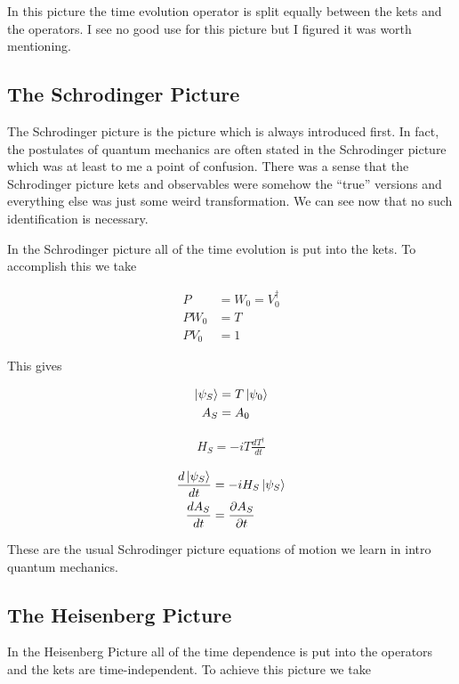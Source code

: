 \documentclass[12pt]{article}
\newcommand{\ddt}[1]{\frac{d #1}{dt}}
\newcommand{\ppt}[1]{\frac{\partial #1}{\partial t}}
\begin{document}
In this picture the time evolution operator is split equally between the kets and the operators. I see no good use for this picture but I figured it was worth mentioning.  

\subsection{The Schrodinger Picture}

The Schrodinger picture is the picture which is always introduced first. In fact, the postulates of quantum mechanics are often stated in the Schrodinger picture which was at least to me a point of confusion. There was a sense that the Schrodinger picture kets and observables were somehow the ``true'' versions and everything else was just some weird transformation. We can see now that no such identification is necessary.

In the Schrodinger picture all of the time evolution is put into the kets. To accomplish this we take

\begin{align}
P &= W_0 = V_0^{\dag}\\
PW_0 &= T\\
PV_0 &= 1
\end{align}

This gives

\begin{align}
\ket{\psi_S} &= T \ket{\psi_0}\\
A_S &= A_0
\end{align}

\begin{align}
H_S = -i T \ddt{T^{\dag}}
\end{align}

\begin{align}
\ddt{\ket{\psi_S}} &= -iH_S \ket{\psi_S}\\
\ddt{A_S} &= \ppt{A_S}
\end{align}

These are the usual Schrodinger picture equations of motion we learn in intro quantum mechanics.

\subsection{The Heisenberg Picture}

In the Heisenberg Picture all of the time dependence is put into the operators and the kets are time-independent. To achieve this picture we take
\end{document}
